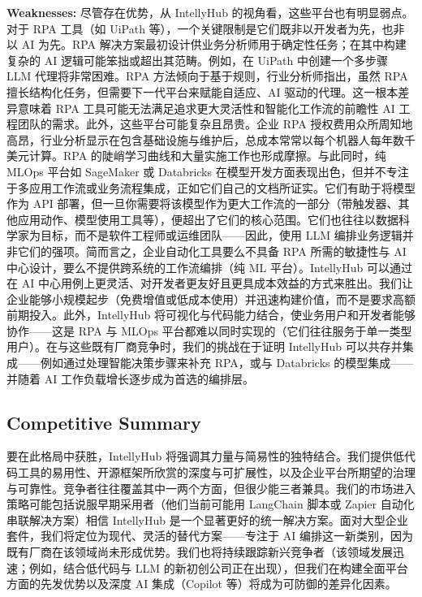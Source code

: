 \documentclass[11pt, a4paper, oneside]{article}
\begin{document}
\textbf{Weaknesses:} 尽管存在优势，从 IntellyHub 的视角看，这些平台也有明显弱点。对于 RPA 工具（如 UiPath 等），一个关键限制是它们既非以开发者为先，也非以 AI 为先。RPA 解决方案最初设计供业务分析师用于确定性任务；在其中构建复杂的 AI 逻辑可能笨拙或超出其范畴。例如，在 UiPath 中创建一个多步骤 LLM 代理将非常困难。RPA 方法倾向于基于规则，行业分析师指出，虽然 RPA 擅长结构化任务，但需要下一代平台来赋能自适应、AI 驱动的代理\cite{forresterRPAvsAI}。这一根本差异意味着 RPA 工具可能无法满足追求更大灵活性和智能化工作流的前瞻性 AI 工程团队的需求。此外，这些平台可能复杂且昂贵。企业 RPA 授权费用众所周知地高昂，行业分析显示在包含基础设施与维护后，总成本常常以每个机器人每年数千美元计算。RPA 的陡峭学习曲线和大量实施工作也形成摩擦。与此同时，纯 MLOps 平台如 SageMaker 或 Databricks 在模型开发方面表现出色，但并不专注于多应用工作流或业务流程集成，正如它们自己的文档所证实\cite{awsSagemaker}。它们有助于将模型作为 API 部署，但一旦你需要将该模型作为更大工作流的一部分（带触发器、其他应用动作、模型使用工具等），便超出了它们的核心范围。它们也往往以数据科学家为目标，而不是软件工程师或运维团队——因此，使用 LLM 编排业务逻辑并非它们的强项。简而言之，企业自动化工具要么不具备 RPA 所需的敏捷性与 AI 中心设计，要么不提供跨系统的工作流编排（纯 ML 平台）。IntellyHub 可以通过在 AI 中心用例上更灵活、对开发者更友好且更具成本效益的方式来胜出。我们让企业能够小规模起步（免费增值或低成本使用）并迅速构建价值，而不是要求高额前期投入。此外，IntellyHub 将可视化与代码能力结合，使业务用户和开发者能够协作——这是 RPA 与 MLOps 平台都难以同时实现的（它们往往服务于单一类型用户）。在与这些既有厂商竞争时，我们的挑战在于证明 IntellyHub 可以共存并集成——例如通过处理智能决策步骤来补充 RPA，或与 Databricks 的模型集成——并随着 AI 工作负载增长逐步成为首选的编排层。

\subsection{Competitive Summary}
要在此格局中获胜，IntellyHub 将强调其力量与简易性的独特结合。我们提供低代码工具的易用性、开源框架所欣赏的深度与可扩展性，以及企业平台所期望的治理与可靠性。竞争者往往覆盖其中一两个方面，但很少能三者兼具。我们的市场进入策略可能包括说服早期采用者（他们当前可能用 LangChain 脚本或 Zapier 自动化串联解决方案）相信 IntellyHub 是一个显著更好的统一解决方案。面对大型企业套件，我们将定位为现代、灵活的替代方案——专注于 AI 编排这一新类别，因为既有厂商在该领域尚未形成优势。我们也将持续跟踪新兴竞争者（该领域发展迅速；例如，结合低代码与 LLM 的新初创公司正在出现），但我们在构建全面平台方面的先发优势以及深度 AI 集成（Copilot 等）将成为可防御的差异化因素。
\end{document}
